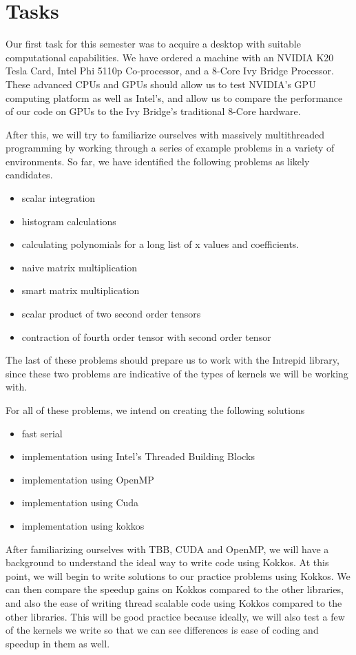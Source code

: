 \documentclass[proposal]{hmcclinic}
\begin{document}
\section{Tasks}

Our first task for this semester was to acquire a desktop with suitable
computational capabilities. We have ordered a machine with an NVIDIA K20 Tesla Card,
Intel Phi 5110p Co-processor, and a 8-Core Ivy Bridge Processor. These advanced CPUs 
and GPUs should allow us to test NVIDIA's GPU computing platform as well as Intel's, and
allow us to compare the performance of our code on GPUs to the Ivy Bridge's traditional
8-Core hardware. 

After this, we will try to familiarize ourselves with massively multithreaded
programming by working through a series of example problems in a variety of
environments. So far, we have identified the following problems as likely candidates.
\begin{itemize}
	\item scalar integration
	\item histogram calculations
	\item calculating polynomials for a long list of x values and coefficients.
	\item naive matrix multiplication
	\item smart matrix multiplication
	\item scalar product of two second order tensors 
	\item contraction of fourth order tensor with second order tensor
\end{itemize}
The last of these problems should prepare us to work with the Intrepid library, since these
two problems are indicative of the types of kernels we will be working with. 

For all of these problems, we intend on creating the following solutions
\begin{itemize}
	\item fast serial
	\item implementation using Intel's Threaded Building Blocks
	\item implementation using OpenMP
	\item implementation using Cuda
	\item implementation using kokkos
\end{itemize}
After familiarizing ourselves with TBB, CUDA and OpenMP, we will have a
background to understand the ideal way to write code using Kokkos. At this
point, we will begin to write solutions to our practice problems using Kokkos.
We can then compare the speedup gains on Kokkos compared to the other
libraries, and also the ease of writing thread scalable code using Kokkos
compared to the other libraries. This will be good practice because ideally, we
will also test a few of the kernels we write so that we can see differences is
ease of coding and speedup in them as well.
\end{document}
